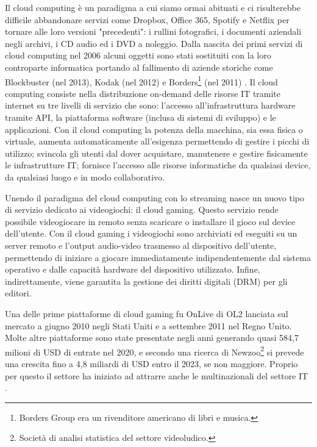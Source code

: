 Il cloud computing è un paradigma a cui siamo ormai abituati e ci risulterebbe difficile abbandonare servizi come Dropbox, Office 365, Spotify e Netflix per tornare alle loro versioni "precedenti": i rullini fotografici, i documenti aziendali negli archivi, i CD audio ed i DVD a noleggio. Dalla nascita dei primi servizi di cloud computing nel 2006 alcuni oggetti sono stati sostituiti con la loro controparte informatica portando al fallimento di aziende storiche come Blockbuster (nel 2013), Kodak (nel 2012) e Borders\footnote{Borders Group era un rivenditore americano di libri e musica.} (nel 2011) \parencite{I_4_fallimenti_più_clamorosi_del_decennio}. Il cloud computing consiste nella distribuzione on-demand delle risorse IT tramite internet su tre livelli di servizio che sono: l'accesso all'infrastruttura hardware tramite API, la piattaforma software (inclusa di sistemi di sviluppo) e le applicazioni. Con il cloud computing la potenza della macchina, sia essa fisica o virtuale, aumenta automaticamente all'esigenza permettendo di gestire i picchi di utilizzo; svincola gli utenti dal dover acquistare, manutenere e gestire fisicamente le infrastrutture IT; fornisce l'accesso alle risorse informatiche da qualsiasi device, da qualsiasi luogo e in modo collaborativo.

Unendo il paradigma del cloud computing con lo streaming nasce un nuovo tipo di servizio dedicato ai videogiochi: il cloud gaming. Questo servizio rende possibile videogiocare in remoto senza scaricare o installare il gioco sul device dell'utente. Con il cloud gaming i videogiochi sono archiviati ed eseguiti su un server remoto e l'output audio-video trasmesso al dispositivo dell'utente, permettendo di iniziare a giocare immediatamente indipendentemente dal sistema operativo e dalle capacità hardware del dispositivo utilizzato. Infine, indirettamente, viene garantita la gestione dei diritti digitali (DRM) per gli editori.

Una delle prime piattaforme di cloud gaming fu OnLive di OL2 lanciata sul mercato a giugno 2010 negli Stati Uniti e a settembre 2011 nel Regno Unito. Molte altre piattaforme sono state presentate negli anni generando quasi 584,7 milioni di USD di entrate nel 2020, e secondo una ricerca di Newzoo\footnote{Società di analisi statistica del settore videoludico.} si prevede una crescita fino a 4,8 miliardi di USD entro il 2023, se non maggiore. Proprio per questo il settore ha iniziato ad attrarre anche le multinazionali del settore IT \parencite{Global_Cloud_Gaming_Report}.

